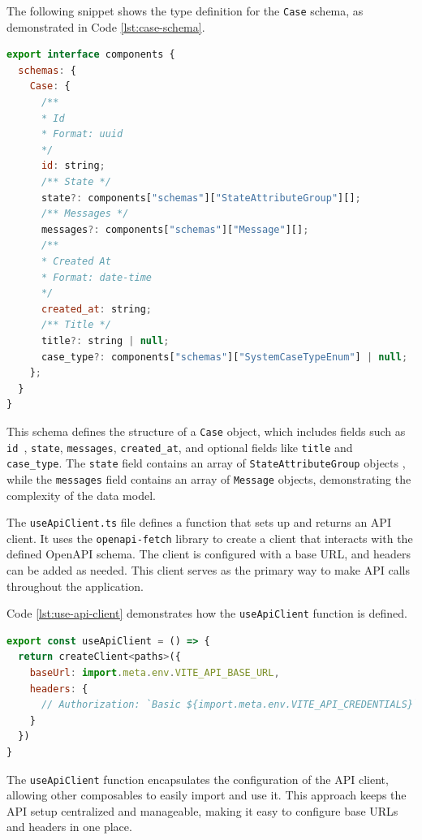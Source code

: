 The following snippet shows the type definition for the \texttt{Case} schema, as demonstrated in Code
\ref{lst:case-schema}.

\begin{lstlisting}[language=JavaScript, caption={Case Schema Definition (\texttt{v1.d.ts})},
  firstnumber=260,label={lst:case-schema}]
export interface components {
  schemas: {
    Case: {
      /**
      * Id
      * Format: uuid
      */
      id: string;
      /** State */
      state?: components["schemas"]["StateAttributeGroup"][];
      /** Messages */
      messages?: components["schemas"]["Message"][];
      /**
      * Created At
      * Format: date-time
      */
      created_at: string;
      /** Title */
      title?: string | null;
      case_type?: components["schemas"]["SystemCaseTypeEnum"] | null;
    };
  }
}
\end{lstlisting}

This schema defines the structure of a \texttt{Case} object, which includes fields such as \texttt{id
}, \texttt{state}, \texttt{messages}, \texttt{created\_at}, and optional fields like \texttt{title} and \texttt{
case\_type}. The \texttt{state} field contains an array of \texttt{StateAttributeGroup} objects
, while the \texttt{messages} field contains an array of \texttt{Message} objects, demonstrating the
complexity of the data model.

The \texttt{useApiClient.ts} file defines a function that sets up and returns an \ac{API} client. It uses the
\texttt{openapi-fetch} library to create a client that
interacts with the defined OpenAPI schema. The client is configured with a base URL, and headers can be added
as needed. This client serves as the primary way to make \ac{API} calls throughout the application.

Code \ref{lst:use-api-client} demonstrates how the \texttt{useApiClient} function is defined.

\begin{lstlisting}[language=JavaScript, caption={Setting up the API Client (\texttt{useApiClient.ts})},
  firstnumber=4,label={lst:use-api-client}]
export const useApiClient = () => {
  return createClient<paths>({
    baseUrl: import.meta.env.VITE_API_BASE_URL,
    headers: {
      // Authorization: `Basic ${import.meta.env.VITE_API_CREDENTIALS}`
    }
  })
}
\end{lstlisting}

The \texttt{useApiClient} function encapsulates
the configuration of the \ac{API} client, allowing other composables to easily import and use it. This approach keeps
the \ac{API} setup centralized and manageable, making it easy to configure base URLs and headers in one place.

